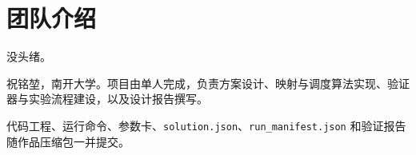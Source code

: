 \section*{团队介绍}
\noindent{}没头绪。\par
\noindent{}祝铭堃，南开大学。项目由单人完成，负责方案设计、映射与调度算法实现、验证器与实验流程建设，以及设计报告撰写。\par
\noindent{}代码工程、运行命令、参数卡、\texttt{solution.json}、\texttt{run\_manifest.json} 和验证报告随作品压缩包一并提交。
